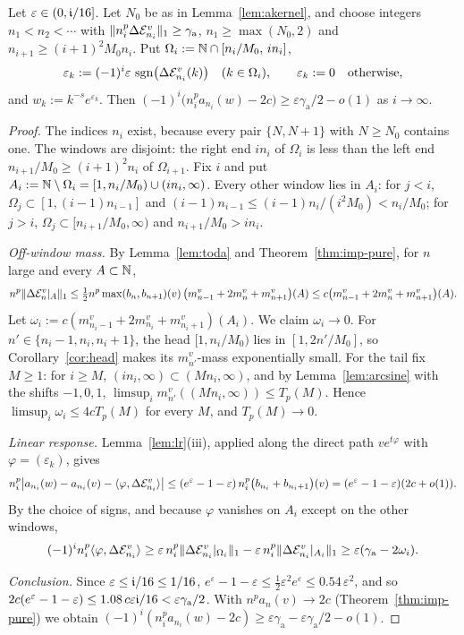 \begin{theorem}\label{thm:rough-a}
Let $\varepsilon\in(0,\mathfrak{i}/16]$. Let $N_0$ be as in Lemma~\ref{lem:akernel}, and choose integers $n_1<n_2<\cdots$ with
$\|n_i^p\Delta\mathcal{E}^v_{n_i}\|_1\ge\gamma_{\mathrm a}$, $n_1\ge\max(N_0,2)$ and $n_{i+1}\ge(i+1)^2M_0n_i$. Put
$\Omega_i:=\mathbb{N}\cap[n_i/M_0,\,in_i]$,
\[
  \varepsilon_k:=(-1)^i\varepsilon\,\operatorname{sgn}\bigl(\Delta\mathcal{E}^v_{n_i}(k)\bigr)\quad(k\in \Omega_i),\qquad\varepsilon_k:=0\quad
  \text{otherwise},
\]
and $w_k:=k^{-s}e^{\varepsilon_k}$. Then $(-1)^i\bigl(n_i^pa_{n_i}(w)-2c\bigr)\ge\varepsilon\gamma_{\mathrm a}/2-o(1)$ as
$i\to\infty$.
\end{theorem}

\begin{proof}
The indices $n_i$ exist, because every pair $\{N,N+1\}$ with $N\ge N_0$ contains one. The windows are disjoint: the
right end $in_i$ of $\Omega_i$ is less than the left end $n_{i+1}/M_0\ge(i+1)^2n_i$ of $\Omega_{i+1}$. Fix $i$ and put
$A_i:=\mathbb{N}\setminus \Omega_i=[1,n_i/M_0)\cup(in_i,\infty)$. Every other window lies in $A_i$: for $j<i$,
$\Omega_j\subset[1,(i-1)n_{i-1}]$ and $(i-1)n_{i-1}\le(i-1)n_i/(i^2M_0)<n_i/M_0$; for $j>i$, $\Omega_j\subset[n_{i+1}/M_0,\infty)$
and $n_{i+1}/M_0>in_i$.

\emph{Off-window mass.} By Lemma~\ref{lem:toda} and Theorem~\ref{thm:imp-pure}, for $n$ large and every $A\subset\mathbb{N}$,
\[
  n^p\|\Delta\mathcal{E}^v_n|_A\|_1\le\tfrac12n^p\max(b_n,b_{n+1})(v)\,\bigl(m^v_{n-1}+2m^v_n+m^v_{n+1}\bigr)(A)
  \le c\bigl(m^v_{n-1}+2m^v_n+m^v_{n+1}\bigr)(A).
\]
Let $\omega_i:=c(m^v_{n_i-1}+2m^v_{n_i}+m^v_{n_i+1})(A_i)$. We claim $\omega_i\to0$. For $n'\in\{n_i-1,n_i,n_i+1\}$,
the head $[1,n_i/M_0)$ lies in $[1,2n'/M_0]$, so Corollary~\ref{cor:head} makes its $m^v_{n'}$-mass exponentially
small. For the tail fix $M\ge1$: for $i\ge M$, $(in_i,\infty)\subset(Mn_i,\infty)$, and by Lemma~\ref{lem:arcsine}
with the shifts $-1,0,1$, $\limsup_im^v_{n'}((Mn_i,\infty))\le T_p(M)$. Hence $\limsup_i\omega_i\le4cT_p(M)$ for every
$M$, and $T_p(M)\to0$.

\emph{Linear response.} Lemma~\ref{lem:lr}(iii), applied along the direct path $ve^{t\varphi}$ with
$\varphi=(\varepsilon_k)$, gives
\[
  n_i^p\bigl|a_{n_i}(w)-a_{n_i}(v)-\langle\varphi,\Delta\mathcal{E}^v_{n_i}\rangle\bigr|
  \le(e^\varepsilon-1-\varepsilon)\,n_i^p\bigl(b_{n_i}+b_{n_i+1}\bigr)(v)=(e^\varepsilon-1-\varepsilon)(2c+o(1)).
\]
By the choice of signs, and because $\varphi$ vanishes on $A_i$ except on the other windows,
\[
  (-1)^in_i^p\langle\varphi,\Delta\mathcal{E}^v_{n_i}\rangle\ge\varepsilon\,n_i^p\|\Delta\mathcal{E}^v_{n_i}|_{\Omega_i}\|_1
  -\varepsilon\,n_i^p\|\Delta\mathcal{E}^v_{n_i}|_{A_i}\|_1\ge\varepsilon(\gamma_{\mathrm a}-2\omega_i).
\]

\emph{Conclusion.} Since $\varepsilon\le\mathfrak{i}/16\le1/16$, $e^\varepsilon-1-\varepsilon\le\frac12\varepsilon^2e^\varepsilon\le
0.54\,\varepsilon^2$, and so $2c(e^\varepsilon-1-\varepsilon)\le1.08\,c\varepsilon\mathfrak{i}/16<\varepsilon\gamma_{\mathrm a}/2$.
With $n^pa_n(v)\to2c$ (Theorem~\ref{thm:imp-pure}) we obtain
$(-1)^i(n_i^pa_{n_i}(w)-2c)\ge\varepsilon\gamma_{\mathrm a}-\varepsilon\gamma_{\mathrm a}/2-o(1)$.
\end{proof}

